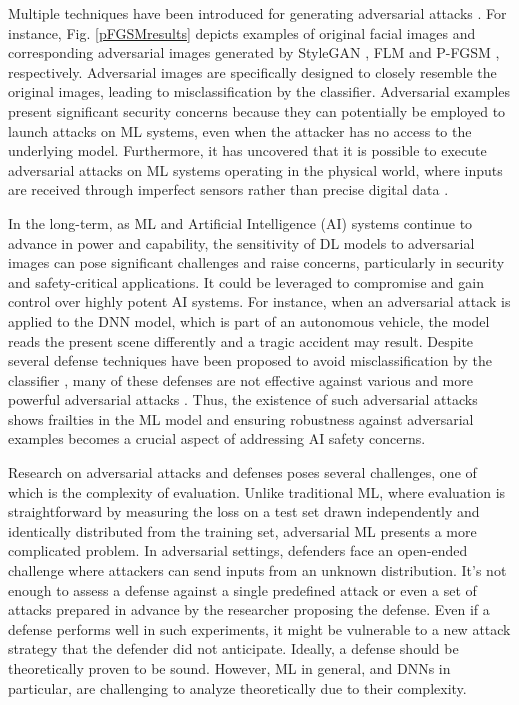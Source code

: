 \documentclass[sn-mathphys]{sn-jnl}%
\theoremstyle{thmstyleone}%
\theoremstyle{thmstyletwo}%
\theoremstyle{thmstylethree}%
\begin{document}
Multiple techniques have been introduced for generating adversarial attacks \cite{carlini2017towards, dong2018boosting, goodfellow2014explaining, kurakin2016adversarial, liu2016delving, papernot2017practical, li2019scene}. For instance, Fig. \ref{pFGSMresults} depicts examples of original facial images and corresponding adversarial images generated by StyleGAN \cite{karras2019style}, FLM \cite{dabouei2019fast} and P-FGSM \cite{li2019scene}, respectively. Adversarial images are specifically designed to closely resemble the original images, leading to misclassification by the classifier. Adversarial examples present significant security concerns because they can potentially be employed to launch attacks on ML systems, even when the attacker has no access to the underlying model. Furthermore, it has uncovered that it is possible to execute adversarial attacks on ML systems operating in the physical world, where inputs are received through imperfect sensors rather than precise digital data \cite{kurakin2016adversarial}. 

In the long-term, as ML and  Artificial Intelligence (AI) systems continue to advance in power and capability, the sensitivity of DL models to adversarial images can pose significant challenges and raise concerns, particularly in security and safety-critical applications. It could be leveraged to compromise and gain control over highly potent AI systems. For instance, when an adversarial attack is applied to the DNN model, which is part of an autonomous vehicle, the model reads the present scene differently and a tragic accident may result. Despite several defense techniques have been proposed to avoid misclassification by the classifier \cite{gu2014towards, madry2017towards, papernot2016distillation, rozsa2016adversarial}, many of these defenses are not effective against various and more powerful adversarial attacks \cite{szegedy2013intriguing, carlini2017adversarial}. %
Thus, the existence of such adversarial attacks shows frailties in the ML model and ensuring robustness against adversarial examples becomes a crucial aspect of addressing AI safety concerns.

Research on adversarial attacks and defenses poses several challenges, one of which is the complexity of evaluation. Unlike traditional ML, where evaluation is straightforward by measuring the loss on a test set drawn independently and identically distributed from the training set, adversarial ML presents a more complicated problem. In adversarial settings, defenders face an open-ended challenge where attackers can send inputs from an unknown distribution. It's not enough to assess a defense against a single predefined attack or even a set of attacks prepared in advance by the researcher proposing the defense. Even if a defense performs well in such experiments, it might be vulnerable to a new attack strategy that the defender did not anticipate. Ideally, a defense should be theoretically proven to be sound. However, ML in general, and DNNs in particular, are challenging to analyze theoretically due to their complexity. 
\end{document}

